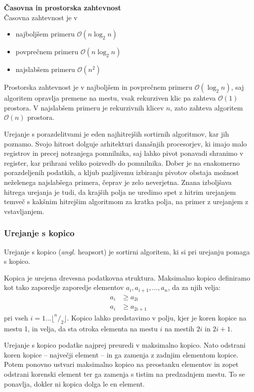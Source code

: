\documentclass[a4paper,oneside,12pt]{article}
\newcommand{\subsubsubsection}[1]{\vspace*{1ex}\textbf{#1}\\}
\begin{document}
\subsubsubsection{Časovna in prostorska zahtevnost} \nopagebreak
Časovna zahtevnost je v \nopagebreak
\begin{itemize}
  \item najboljšem primeru $\mathcal{O}(n\log_2 n)$
  \item povprečnem primeru $\mathcal{O}(n\log_2 n)$
  \item najslabšem primeru $\mathcal{O}(n^2)$
\end{itemize}

Prostorska zahtevnost je v najboljšem in povprečnem primeru $\mathcal{O}(\log_2 n)$, 
saj algoritem opravlja premene na mestu, vsak rekurziven klic pa zahteva $\mathcal{O}(1)$ prostora.
V najslabšem primeru je rekurzivnih klicev $n$, zato zahteva algoritem $\mathcal{O}(n)$ prostora.

Urejanje s porazdelitvami je eden najhitrejših sortirnih algoritmov, kar jih
poznamo. Svojo hitrost dolguje arhitekturi današnjih procesorjev, ki imajo
malo registrov in precej notranjega pomnilnika, saj lahko pivot ponavadi shranimo v
register, kar prihrani veliko poizvedb do pomnilnika. Dober je na enakomerno
porazdeljenih podatkih, a kljub pazljivemu izbiranju pivotov obstaja možnost neželenega
najslabšega primera, čeprav je zelo neverjetna. Znana izboljšava hitrega
urejanja je tudi, da krajših polja ne uredimo spet z hitrim urejanjem temveč s
kakšnim hitrejšim algoritmom za kratka polja, na primer z urejanjem z
vstavljanjem.

\subsubsection{Urejanje s kopico}
\label{chapter:heapsort}
Urejanje s kopico (\emph{angl.} heapsort) je sortirni algoritem,
ki si pri urejanju pomaga s kopico.
\newline

Kopica je urejena drevesna podatkovna struktura.
Maksimalno kopico definiramo kot tako zaporedje zaporedje elementov $a_i, a_{i+1}, \ldots,
a_n$, da za njih velja:
\begin{align*}
  a_i &\geq a_{2i} \\
  a_i &\geq a_{2i+1}
\end{align*}
pri vseh $i = 1 \ldots \lfloor ^n/_2 \rfloor$.
Kopico lahko predstavimo v polju, kjer je koren kopice na mestu 1, in velja, da sta otroka
elementa na mestu $i$ na mestih $2i$ in $2i + 1$.

Urejanje s kopico podatke najprej preuredi v maksimalno kopico. Nato odstrani koren kopice
-- največji element -- in ga zamenja z zadnjim elementom kopice. Potem ponovno ustvari
maksimalno kopico na preostanku elementov in zopet odstrani korenski element ter ga
zamenja s tistim na predzadnjem mestu. To se ponavlja, dokler ni kopica dolga le en
element. 
\end{document}
